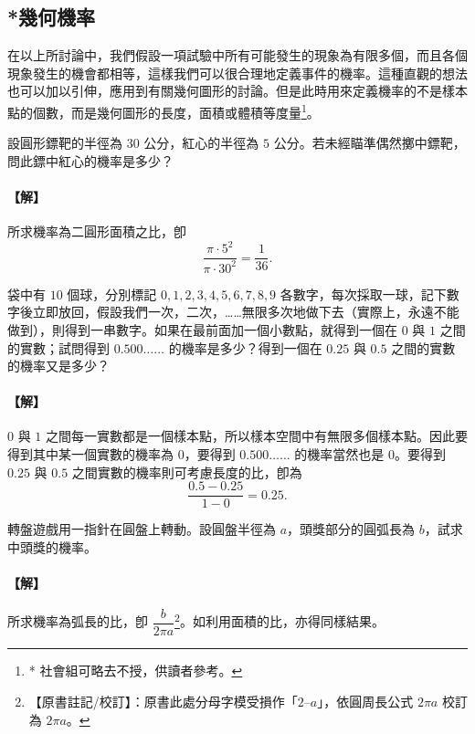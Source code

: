 \subsection{*幾何機率}\label{sec:b5s-3-3}

在以上所討論中，我們假設一項試驗中所有可能發生的現象為有限多個，而且各個現象發生的機會都相等，這樣我們可以很合理地定義事件的機率。這種直觀的想法也可以加以引伸，應用到有關幾何圖形的討論。但是此時用來定義機率的不是樣本點的個數，而是幾何圖形的長度，面積或體積等度量\footnote{* 社會組可略去不授，供讀者參考。}。

\medskip
\begin{example}\label{ex:b5s-3-9}
設圓形鏢靶的半徑為 $30$ 公分，紅心的半徑為 $5$ 公分。若未經瞄準偶然擲中鏢靶，問此鏢中紅心的機率是多少？
\end{example}
\paragraph{【解】}
所求機率為二圓形面積之比，卽
\[
\frac{\pi \cdot 5^2}{\pi \cdot 30^2} = \frac{1}{36}. \tag*{\#}
\]

\medskip
\begin{example}\label{ex:b5s-3-10}
袋中有 $10$ 個球，分別標記 $0, 1, 2, 3, 4, 5, 6, 7, 8, 9$ 各數字，每次採取一球，記下數字後立即放回，假設我們一次，二次，……無限多次地做下去（實際上，永遠不能做到），則得到一串數字。如果在最前面加一個小數點，就得到一個在 $0$ 與 $1$ 之間的實數；試問得到 $0.500\dots\dots$ 的機率是多少？得到一個在 $0.25$ 與 $0.5$ 之間的實數的機率又是多少？
\end{example}
\paragraph{【解】}
$0$ 與 $1$ 之間每一實數都是一個樣本點，所以樣本空間中有無限多個樣本點。因此要得到其中某一個實數的機率為 $0$，要得到 $0.500\dots\dots$ 的機率當然也是 $0$。要得到 $0.25$ 與 $0.5$ 之間實數的機率則可考慮長度的比，卽為
\[
\frac{0.5 - 0.25}{1 - 0} = 0.25.
\]

\medskip
\begin{example}\label{ex:b5s-3-11}
轉盤遊戲用一指針在圓盤上轉動。設圓盤半徑為 $a$，頭獎部分的圓弧長為 $b$，試求中頭獎的機率。
\end{example}
\paragraph{【解】}
所求機率為弧長的比，卽 $\dfrac{b}{2\pi a}$\label{note:b5s-ch3-p111-2pia}\footnote{【原書註記/校訂】：原書此處分母字模受損作「$2\text{--}a$」，依圓周長公式 $2\pi a$ 校訂為 $2\pi a$。}。如利用面積的比，亦得同樣結果。

